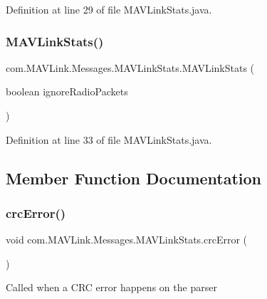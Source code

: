 Definition at line 29 of file M\+A\+V\+Link\+Stats.\+java.

\mbox{\label{classcom_1_1MAVLink_1_1Messages_1_1MAVLinkStats_a53a7b219944fb2bf8d147a031a1af65e}} 
\subsubsection{\texorpdfstring{MAVLinkStats()}{MAVLinkStats()}\hspace{0.1cm}{\footnotesize\ttfamily [2/2]}}
{\footnotesize\ttfamily com.\+M\+A\+V\+Link.\+Messages.\+M\+A\+V\+Link\+Stats.\+M\+A\+V\+Link\+Stats (\begin{DoxyParamCaption}\item[{boolean}]{ignore\+Radio\+Packets }\end{DoxyParamCaption})\hspace{0.3cm}{\ttfamily [inline]}}



Definition at line 33 of file M\+A\+V\+Link\+Stats.\+java.



\subsection{Member Function Documentation}
\mbox{\label{classcom_1_1MAVLink_1_1Messages_1_1MAVLinkStats_a15deaa3b7c3753cc5a4cd11332f05182}} 
\subsubsection{\texorpdfstring{crcError()}{crcError()}}
{\footnotesize\ttfamily void com.\+M\+A\+V\+Link.\+Messages.\+M\+A\+V\+Link\+Stats.\+crc\+Error (\begin{DoxyParamCaption}{ }\end{DoxyParamCaption})\hspace{0.3cm}{\ttfamily [inline]}}

Called when a C\+RC error happens on the parser 

